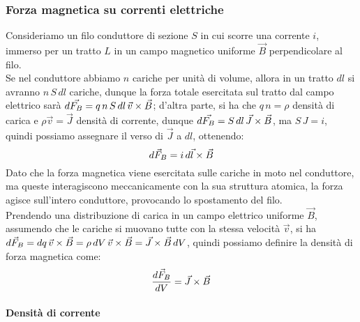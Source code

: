 \documentclass[]{article}
\begin{document}
\subsubsection{Forza magnetica su correnti elettriche}

Consideriamo un filo conduttore di sezione $ S $ in cui scorre una corrente $ i $, immerso per un tratto $ L $ in un campo magnetico uniforme $ \vec{B} $ perpendicolare al filo. \\ 
%
Se nel conduttore abbiamo $ n $ cariche per unità di volume, allora in un tratto $ dl $  si avranno $ n \, S \, dl $ cariche, dunque la forza totale esercitata sul tratto dal campo elettrico sarà $ d\vec{F_B} = q \, n \, S \, dl \, \vec{v}\times\vec{B} $; d'altra parte, si ha che $ q \, n = \rho $ densità di carica e $ \rho \vec{v} = \vec{J} $ densità di corrente, dunque $ d\vec{F_B} = S \, dl \, \vec{J}\times\vec{B} $, ma $ S \, J = i $, quindi possiamo assegnare il verso di $ \vec{J} $ a $ dl $, ottenendo:
\begin{equation}
	d\vec{F}_B = i \, d\vec{l}\times\vec{B}
	\label{eq:forza-filo}
\end{equation}
Dato che la forza magnetica viene esercitata sulle cariche in moto nel conduttore, ma queste interagiscono meccanicamente con la sua struttura atomica, la forza agisce sull'intero conduttore, provocando lo spostamento del filo. \\ 
%
Prendendo una distribuzione di carica in un campo elettrico uniforme $ \vec{B} $, assumendo che le cariche si muovano tutte con la stessa velocità $ \vec{v} $, si ha $ d\vec{F}_B = dq \, \vec{v}\times\vec{B} = \rho \, dV \, \vec{v}\times\vec{B} = \vec{J}\times\vec{B} \, dV $, quindi possiamo definire la densità di forza magnetica come:
\begin{equation}
	\displaystyle\frac{d\vec{F}_B}{dV} = \vec{J}\times\vec{B}
	\label{eq:dens-f-mag}
\end{equation}

\paragraph{Densità di corrente}
\end{document}
